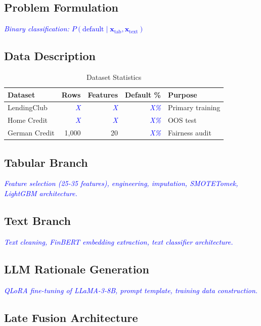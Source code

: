 \documentclass[preprint,12pt]{elsarticle}
\newcommand{\PLACEHOLDER}[1]{\textcolor{blue}{\textit{#1}}}
\begin{document}
\subsection{Problem Formulation}
\PLACEHOLDER{Binary classification: $P(\text{default} \mid \mathbf{x}_{\text{tab}}, \mathbf{x}_{\text{text}})$}

\subsection{Data Description}

\begin{table}[h]
\centering
\caption{Dataset Statistics}
\label{tab:datasets}
\begin{tabular}{lrrrl}
\toprule
\textbf{Dataset} & \textbf{Rows} & \textbf{Features} & \textbf{Default \%} & \textbf{Purpose} \\
\midrule
LendingClub & \PLACEHOLDER{X} & \PLACEHOLDER{X} & \PLACEHOLDER{X\%} & Primary training \\
Home Credit & \PLACEHOLDER{X} & \PLACEHOLDER{X} & \PLACEHOLDER{X\%} & OOS test \\
German Credit & 1,000 & 20 & \PLACEHOLDER{X\%} & Fairness audit \\
\bottomrule
\end{tabular}
\end{table}

\subsection{Tabular Branch}
\PLACEHOLDER{Feature selection (25-35 features), engineering, imputation, SMOTETomek, LightGBM architecture.}

\subsection{Text Branch}
\PLACEHOLDER{Text cleaning, FinBERT embedding extraction, text classifier architecture.}

\subsection{LLM Rationale Generation}
\PLACEHOLDER{QLoRA fine-tuning of LLaMA-3-8B, prompt template, training data construction.}

\subsection{Late Fusion Architecture}
\end{document}
